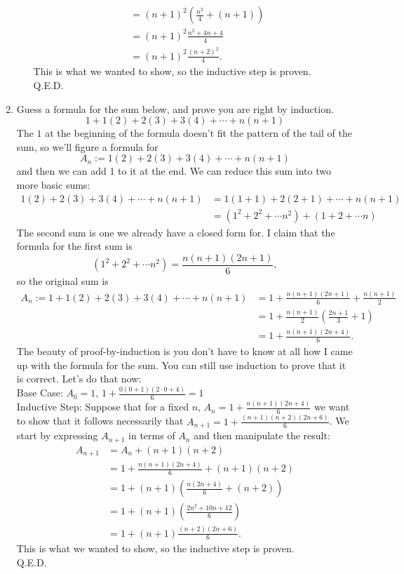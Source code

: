 \documentclass[12pt]{amsart}
\begin{document}
\begin{enumerate}
\begin{enumerate}
\begin{align*}
            & = (n+1)^2 (\frac{n^2}{4} + (n+1) ) \\
            & = (n+1)^2  \frac{n^2 + 4n +4}{4} \\
            & = (n+1)^2 \frac{(n+2)^2}{4}.
    \end{align*}
    This is what we wanted to show, so the inductive step is proven.\\
    Q.E.D.
    \end{enumerate}
\item Guess a formula for the sum below, and prove you are right by
    induction.
    \[
    1 + 1(2) + 2(3) + 3(4) + \cdots  +  n(n + 1)
    \]
    The $1$ at the beginning of the formula doesn't fit the pattern of the
    tail of the sum, so we'll figure a formula for
    \[
    A_{n} := 1(2) + 2(3) + 3(4) + \cdots  +  n(n + 1)
    \]
    and then we can add 1 to it at the end. We can reduce this sum
    into two more basic sums:
    \begin{align*}
    1(2) + 2(3) + 3(4) + \cdots  +  n(n + 1)
        &= 1(1 + 1) + 2(2 + 1) + \cdots + n(n+1) \\
        &= (1^2 + 2^2 + \cdots n^2) + (1 + 2 +  \cdots n)
    \end{align*}
    The second sum is one we already have a closed form for. I claim
    that the formula for the first sum is
    \[
    (1^2 + 2^2 + \cdots n^2) = \frac{n(n+1)(2n+1)}{6},
    \]
    so the original sum is
    \begin{align*}
    A_n := 1 + 1(2) + 2(3) + 3(4) + \cdots  +  n(n + 1)
        &= 1 + \frac{n(n+1)(2n+1)}{6} + \frac{n(n+1)}{2} \\
        &= 1 + \frac{n(n+1)}{2}(\frac{2n+1}{3} +1) \\
        &= 1 + \frac{n(n+1)(2n+4)}{6}.
    \end{align*}
    The beauty of proof-by-induction is you don't have to know at all how
    I came up with the formula for the sum. You can still use
    induction to prove that it is correct. Let's do that now: \\
    Base Case: $A_0 = 1$,  $1 + \frac{0(0+1)(2 \cdot 0+4)}{6} = 1$ \\
    Inductive Step: Suppose that for a fixed $n$, $A_n = 1 + \frac{n(n+1)(2n+4)}{6}$
    we want to show that it follows necessarily that $A_{n+1} = 1 + \frac{(n+1)(n+2)(2n+6)}{6}$. We start
    by expressing $A_{n+1}$ in terms of $A_n$ and then manipulate the result:
    \begin{align*}
    A_{n+1} & = A_n + (n+1)(n+2) \\
            & = 1 + \frac{n(n+1)(2n+4)}{6} + (n+1)(n+2) \\
            & = 1 + (n+1) (\frac{n(2n+4)}{6} + (n+2)) \\
            & = 1 + (n+1) (\frac{ 2n^2 + 10n + 12}{6})  \\
            & = 1 + (n+1) \frac{(n+2)(2n+6)}{6}.
    \end{align*}
    This is what we wanted to show, so the inductive step is proven.\\
    Q.E.D.
\end{enumerate}
\end{document}
